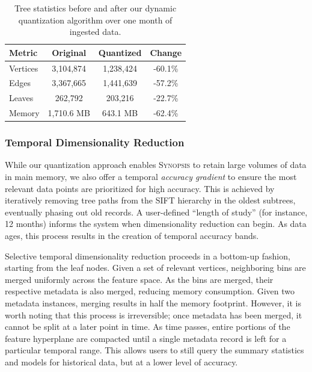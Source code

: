 \begin{table}[h!]
    \renewcommand{\arraystretch}{1.3}
    \caption{Tree statistics before and after our dynamic quantization algorithm over one month of ingested data.\vspace{-1em}}
    \label{tbl:tree-stats}
    \begin{center}
        \begin{tabular}{|l|c|c|c|}
            \hline
            \textbf{Metric} & \textbf{Original} & \textbf{Quantized} & \textbf{Change} \\
            \hline
            Vertices & 3,104,874 & 1,238,424 & -60.1\% \\
            \hline
            Edges    & 3,367,665 & 1,441,639 & -57.2\% \\
            \hline
            Leaves   & 262,792   & 203,216   & -22.7\% \\
            \hline
            Memory   & 1,710.6 MB & 643.1 MB  & -62.4\% \\
            \hline
        \end{tabular}
    \end{center}
\end{table}

\subsubsection{Temporal Dimensionality Reduction}
While our quantization approach enables \textsc{Synopsis} to retain large volumes of data in main memory, we also offer a temporal \emph{accuracy gradient} to ensure the most relevant data points are prioritized for high accuracy. This is achieved by iteratively removing tree paths from the SIFT hierarchy in the oldest subtrees, eventually phasing out old records. A user-defined ``length of study'' (for instance, 12 months) informs the system when dimensionality reduction can begin. As data ages, this process results in the creation of temporal accuracy bands.

Selective temporal dimensionality reduction proceeds in a bottom-up fashion, starting from the leaf nodes. Given a set of relevant vertices, neighboring bins are merged uniformly across the feature space. As the bins are merged, their respective metadata is also merged, reducing memory consumption. Given two metadata instances, merging results in half the memory footprint. However, it is worth noting that this process is irreversible; once metadata has been merged, it cannot be split at a later point in time. As time passes, entire portions of the feature hyperplane are compacted until a single metadata record is left for a particular temporal range. This allows users to still query the summary statistics and models for historical data, but at a lower level of accuracy.
